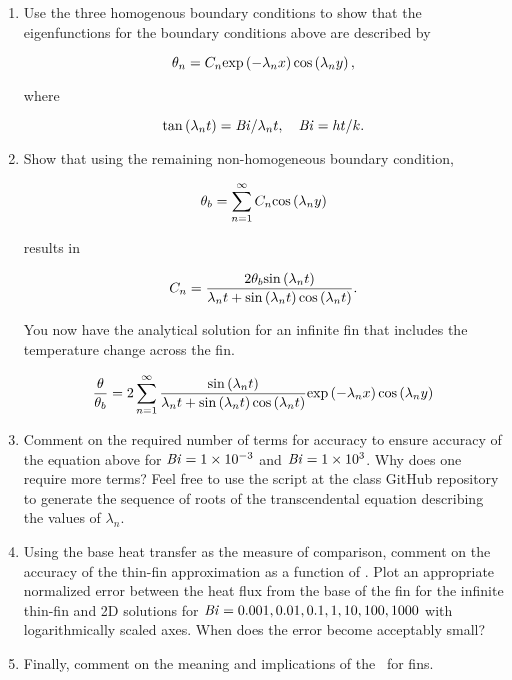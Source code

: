 \documentclass[12pt,letterpaper]{article}
\begin{document}
\begin{enumerate}
\begin{enumerate}
		\item Use the three homogenous boundary conditions to show that the eigenfunctions for the boundary conditions above are described by
			
			\begin{equation*}
				\theta_n = C_n \mathrm{exp} \left( - \lambda_n x \right) \mathrm{cos} \left( \lambda_n y \right),
			\end{equation*}
			
			where
			
			\begin{equation*}
				\mathrm{tan} \left( \lambda_n t \right) = \mathit{Bi} / \lambda_n t, \quad \mathit{Bi}= h t / k .
			\end{equation*}
		
		\item Show that using the remaining non-homogeneous boundary condition,
		
			\begin{equation*}
				\theta_b = \sum_{n = 1}^\infty C_n \mathrm{cos} \left( \lambda_n y \right)
			\end{equation*}
			
			results in
			
			\begin{equation*}
				C_n = \frac{2 \theta_b \mathrm{sin} \left( \lambda_n t \right)}{\lambda_n t + \mathrm{sin} \left( \lambda_n t \right) \mathrm{cos} \left( \lambda_n t \right)}.
			\end{equation*}
			
			You now have the analytical solution for an infinite fin that includes the temperature change across the fin.
			
			\begin{equation*}
				\frac{\theta}{\theta_b} = 2 \sum_{n=1}^{\infty} \frac{\mathrm{sin} \left( \lambda_n t \right)}{\lambda_n t + \mathrm{sin} \left( \lambda_n t \right) \mathrm{cos} \left( \lambda_n t \right)} \mathrm{exp} \left( - \lambda_n x \right) \mathrm{cos} \left( \lambda_n y \right)
			\end{equation*}
		
		\item Comment on the required number of terms for accuracy to ensure accuracy of the equation above for $\mathit{Bi} = 1 \times 10^{-3}$ and $\mathit{Bi} = 1 \times 10^3$.
		Why does one require more terms?
		Feel free to use the script at the class GitHub repository to generate the sequence of roots of the transcendental equation describing the values of $\lambda_n$.
		
		\item Using the base heat transfer as the measure of comparison, comment on the accuracy of the thin-fin approximation as a function of \Bi.
		Plot an appropriate normalized error between the heat flux from the base of the fin for the infinite thin-fin and 2D solutions for $\mathit{Bi} = 0.001, 0.01, 0.1, 1, 10, 100, 1000$ with logarithmically scaled axes.
		When does the error become acceptably small?
		
		\item Finally, comment on the meaning and implications of the \Bi~for fins.

	\end{enumerate}


\end{enumerate}
\end{document}
